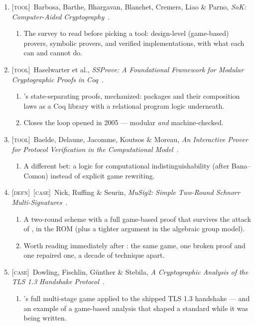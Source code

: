 \documentclass[11pt]{article}
\newcommand{\kind}[1]{{\footnotesize\textsc{\textcolor{yearcolor}{[#1]}}}\ }
\newcommand{\defn}{\kind{defn}}
\newcommand{\tool}{\kind{tool}}
\newcommand{\case}{\kind{case}}
\newcommand{\paper}[3]{#1, \emph{#2}~\cite{#3}.}
\begin{document}
\begin{enumerate}
  \item \tool \paper{Barbosa, Barthe, Bhargavan, Blanchet, Cremers, Liao \&
    Parno}{SoK: Computer-Aided Cryptography}{SoKCAC21}
    \begin{enumerate}
      \item The survey to read before picking a tool: design-level (game-based)
        provers, symbolic provers, and verified implementations, with what each
        can and cannot do.
    \end{enumerate}

  \item \tool \paper{Haselwarter et al.}{SSProve: A Foundational Framework for
    Modular Cryptographic Proofs in Coq}{SSProve21}
    \begin{enumerate}
      \item \cite{SSP18}'s state-separating proofs, mechanized: packages and
        their composition laws as a Coq library with a relational program logic
        underneath.
      \item Closes the loop \cite{Hal05} opened in 2005 --- modular \emph{and}
        machine-checked.
    \end{enumerate}

  \item \tool \paper{Baelde, Delaune, Jacomme, Koutsos \& Moreau}{An Interactive
    Prover for Protocol Verification in the Computational Model}{Squirrel21}
    \begin{enumerate}
      \item A different bet: a logic for computational indistinguishability
        (after Bana--Comon) instead of explicit game rewriting.
    \end{enumerate}

  \item \defn\case \paper{Nick, Ruffing \& Seurin}{MuSig2: Simple Two-Round
    Schnorr Multi-Signatures}{NRS21}
    \begin{enumerate}
      \item A two-round scheme with a full game-based proof that survives the
        attack of \cite{DEFKLNS19}, in the ROM (plus a tighter argument in the
        algebraic group model).
      \item Worth reading immediately after \cite{DEFKLNS19}: the same game, one
        broken proof and one repaired one, a decade of technique apart.
    \end{enumerate}

  \item \case \paper{Dowling, Fischlin, Günther \& Stebila}{A Cryptographic
    Analysis of the TLS 1.3 Handshake Protocol}{DFGS21}
    \begin{enumerate}
      \item \cite{FG14}'s full multi-stage game applied to the shipped TLS 1.3
        handshake --- and an example of a game-based analysis that shaped a
        standard while it was being written.
    \end{enumerate}
\end{enumerate}
\end{document}
